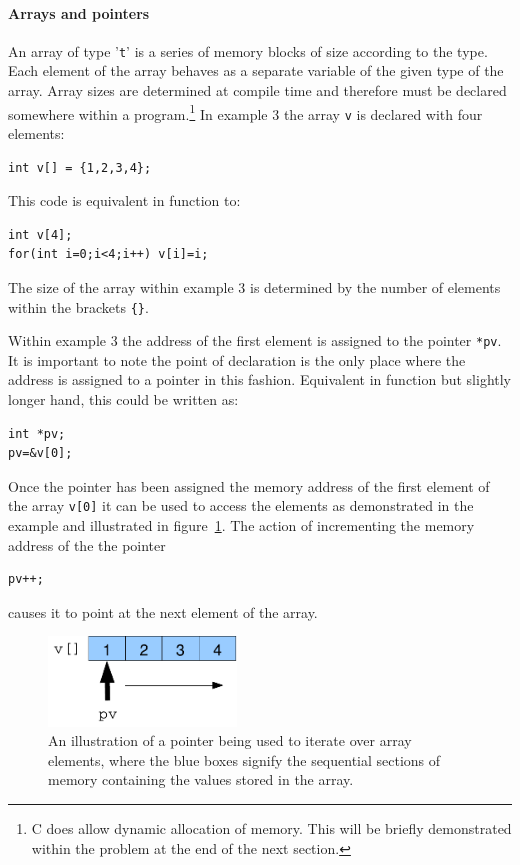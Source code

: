 \documentclass[11pt]{scrartcl}
\begin{document}
\paragraph{Arrays and pointers}
An array of type '\texttt{t}' is a series of memory blocks of size
according to the type.  Each element of the array behaves as a
separate variable of the given type of the array.  Array sizes are
determined at compile time and therefore must be declared somewhere
within a program.\footnote{C does allow dynamic allocation of memory.
This will be briefly demonstrated within the problem at the end of the
next section.}  In example 3 the array \texttt{v} is declared with
four elements:
\begin{lstlisting}
int v[] = {1,2,3,4};
\end{lstlisting}
This code is equivalent in function to:
\begin{lstlisting}
int v[4];
for(int i=0;i<4;i++) v[i]=i;
\end{lstlisting}
The size of the array within example 3 is determined by the number of
elements within the brackets \texttt{\{\}}.

Within example 3 the address of the first element is assigned to the
pointer \texttt{*pv}.  It is important to note the point of
declaration is the only place where the address is assigned to a
pointer in this fashion.  Equivalent in function but slightly longer
hand, this could be written as:
\begin{lstlisting}
int *pv;
pv=&v[0];
\end{lstlisting}
Once the pointer has been assigned the memory address of the first
element of the array \texttt{v[0]} it can be used to access the
elements as demonstrated in the example and illustrated in
figure~\ref{figure:pointer_array}.  The action of incrementing the
memory address of the the pointer
\begin{lstlisting}
pv++;
\end{lstlisting}
causes it to point at the next element of the array.

\begin{figure}[h]
\begin{center}
\includegraphics[width=5cm]{figures/pointer_array}
\caption{An illustration of a pointer being used to iterate over array elements, where the blue boxes signify the sequential sections of memory containing the values stored in the array.
\label{figure:pointer_array}}
\end{center}
\end{figure}
\end{document}
